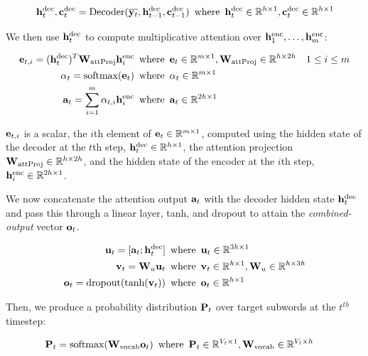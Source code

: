 \begin{align}
    \mathbf{h}^{\text{dec}}_t, \mathbf{c}^{\text{dec}}_t = \text{Decoder}(\overline{\mathbf{y}_t}, \mathbf{h}^{\text{dec}}_{t-1}, \mathbf{c}^{\text{dec}}_{t-1}) \enspace &\text{where} \enspace \mathbf{h}^{\text{dec}}_t \in \mathbb{R}^{h \times 1}, \mathbf{c}^{\text{dec}}_t \in \mathbb{R}^{h \times 1}\\
\end{align}

We then use $\mathbf{h}^{\text{dec}}_t$ to compute  multiplicative attention over $\mathbf{h}^{\text{enc}}_1, \dots, \mathbf{h}^{\text{enc}}_m$:

\begin{align}
    \mathbf{e}_{t, i} = (\mathbf{h}^{\text{dec}}_t)^T\mathbf{W}_{\text{attProj}}\mathbf{h}^{\text{enc}}_i \enspace &\text{where} \enspace \mathbf{e}_{t} \in \mathbb{R}^{m \times 1}, \mathbf{W}_{\text{attProj}}\in \mathbb{R}^{h \times 2h} & 1 \le i \le m \\
    \alpha_t= \text{softmax}(\mathbf{e}_t) \enspace &\text{where} \enspace \alpha_t \in \mathbb{R}^{m \times 1}\\
    \mathbf{a}_t = \sum_{i=1}^{m}\alpha_{t,i}\mathbf{h}^{\text{enc}}_i \enspace &\text{where} \enspace \mathbf{a}_t \in \mathbb{R}^{2h \times 1}
\end{align}
 
$\mathbf{e}_{t, i}$ is a scalar, the $i$th element of $\mathbf{e}_{t} \in \mathbb{R}^{m \times 1}$, computed using the hidden state of the decoder at the $t$th step, $\mathbf{h}^{\text{dec}}_t \in \mathbb{R}^{h \times 1}$, the attention projection $\mathbf{W}_{\text{attProj}} \in \mathbb{R}^{h \times 2h}$, and the hidden state of the encoder at the $i$th step, $\mathbf{h}^{\text{enc}}_i \in \mathbb{R}^{2h \times 1}$.

We now concatenate the attention output $\mathbf{a}_t$ with the decoder hidden state $\mathbf{h}^{\text{dec}}_t$ and pass this through a linear layer, tanh, and dropout to attain the \textit{combined-output} vector $\mathbf{o}_{t}$.

\begin{align}   
    \mathbf{u}_{t} = [\mathbf{a}_{t}; \mathbf{h}^{\text{dec}}_t] \enspace &\text{where} \enspace \mathbf{u}_t \in  \mathbb{R}^{3h \times 1} \\
    \mathbf{v}_t = \mathbf{W}_{u}\mathbf{u}_t \enspace &\text{where} \enspace \mathbf{v}_t \in \mathbb{R}^{h \times 1}, \mathbf{W}_{u} \in \mathbb{R}^{h \times 3h}\\
    \mathbf{o}_t = \text{dropout}(\text{tanh}(\mathbf{v}_t)) \enspace &\text{where} \enspace \mathbf{o}_t \in \mathbb{R}^{h \times 1}
\end{align}

Then, we produce a probability distribution $\mathbf{P}_t$ over target subwords at the $t^{th}$ timestep:

\begin{align}
    \mathbf{P}_t = \text{softmax}(\mathbf{W}_{\text{vocab}}\mathbf{o}_{t}) \enspace &\text{where} \enspace \mathbf{P}_t \in \mathbb{R}^{V_{t} \times 1}, \mathbf{W}_{\text{vocab}} \in \mathbb{R}^{V_{t} \times h}
\end{align}

